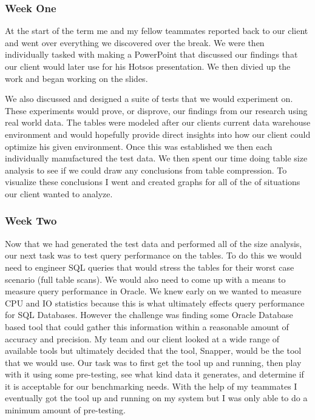 \documentclass[10pt]{article}
\begin{document}
\subsubsection{Week One}
At the start of the term me and my fellow teammates reported back to our client and went over everything we discovered over the break. We were then individually tasked with making a PowerPoint that discussed our findings that our client would later use for his Hotsos presentation. We then divied up the work and began working on the slides.

We also discussed and designed a suite of tests that we would experiment on. These experiments would prove, or disprove, our findings from our research using real world data. The tables were modeled after our clients current data warehouse environment and would hopefully provide direct insights into how our client could optimize his given environment. Once this was established we then each individually manufactured the test data. We then spent our time doing table size analysis to see if we could draw any conclusions from table compression. To visualize these conclusions I went and created graphs for all of the of situations our client wanted to analyze.

\subsubsection{Week Two}
Now that we had generated the test data and performed all of the size analysis, our next task was to test query performance on the tables. To do this we would need to engineer SQL queries that would stress the tables for their worst case scenario (full table scans). We would also need to come up with a means to measure query performance in Oracle. We knew early on we wanted to measure CPU and IO statistics because this is what ultimately effects query performance for SQL Databases. However the challenge was finding some Oracle Database based tool that could gather this information within a reasonable amount of accuracy and precision. My team and our client looked at a wide range of available tools but ultimately decided that the tool, Snapper, would be the tool that we would use. Our task was to first get the tool up and running, then play with it using some pre-testing, see what kind data it generates, and determine if it is acceptable for our benchmarking needs. With the help of my teammates I eventually got the tool up and running on my system but I was only able to do a minimum amount of pre-testing.
\end{document}
